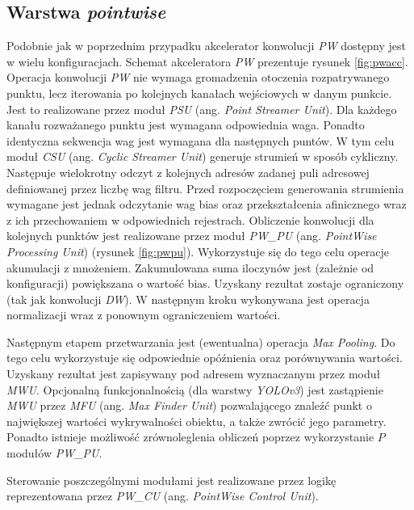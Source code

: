 \subsection{Warstwa \emph{pointwise}}
Podobnie jak w poprzednim przypadku akcelerator konwolucji \emph{PW} dostępny jest w wielu konfiguracjach.
Schemat akceleratora \emph{PW} prezentuje rysunek \ref{fig:pwacc}.
Operacja konwolucji \emph{PW} nie wymaga gromadzenia otoczenia rozpatrywanego punktu, lecz iterowania po kolejnych kanałach wejściowych w danym punkcie.
Jest to realizowane przez moduł \emph{PSU} (ang. \emph{Point Streamer Unit}).
Dla każdego kanału rozważanego punktu jest wymagana odpowiednia waga.
Ponadto identyczna sekwencja wag jest wymagana dla następnych puntów.
W tym celu moduł \emph{CSU} (ang. \emph{Cyclic Streamer Unit}) generuje strumień w sposób cykliczny.
Następuje wielokrotny odczyt z kolejnych adresów zadanej puli adresowej definiowanej przez liczbę wag filtru. 
Przed rozpoczęciem generowania strumienia wymagane jest jednak odczytanie wag bias oraz przekształcenia afinicznego wraz z ich przechowaniem w odpowiednich rejestrach.
Obliczenie konwolucji dla kolejnych punktów jest realizowane przez moduł \emph{PW\_PU} (ang. \emph{PointWise Processing Unit}) (rysunek \ref{fig:pwpu}).
Wykorzystuje się do tego celu operacje akumulacji z mnożeniem.
Zakumulowana suma iloczynów jest (zależnie od konfiguracji) powiększana o wartość bias.
Uzyskany rezultat zostaje ograniczony (tak jak konwolucji \emph{DW}).
W następnym kroku wykonywana jest operacja normalizacji wraz z ponownym ograniczeniem wartości.

Następnym etapem przetwarzania jest (ewentualna) operacja \emph{Max Pooling}.
Do tego celu wykorzystuje się odpowiednie opóźnienia oraz porównywania wartości.
Uzyskany rezultat jest zapisywany pod adresem wyznaczanym przez moduł \emph{MWU}.
Opcjonalną funkcjonalnością (dla warstwy \emph{YOLOv3}) jest zastąpienie \emph{MWU} przez \emph{MFU} (ang. \emph{Max Finder Unit}) pozwalającego znaleźć punkt o największej wartości wykrywalności obiektu, a także zwrócić jego parametry.
Ponadto istnieje możliwość zrównoleglenia obliczeń poprzez wykorzystanie $P$ modułów \emph{PW\_PU}. 

Sterowanie poszczególnymi modułami jest realizowane przez logikę reprezentowana przez \emph{PW\_CU} (ang. \emph{PointWise Control Unit}).

